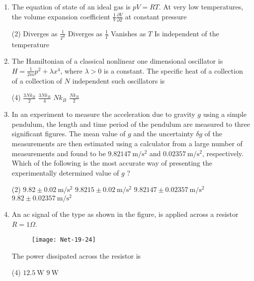 \begin{enumerate}
\begin{tasks}
\begin{figure}[H]
	\end{figure}
\end{tasks}
\item  The equation of state of an ideal gas is $p V=R T .$ At very low temperatures, the volume expansion coefficient $\frac{1}{V} \frac{\partial V}{\partial T}$ at constant pressure
 \begin{tasks}(2)
	\task[\textbf{a.}]Diverges as $\frac{1}{T^{2}}$
	\task[\textbf{b.}]Diverges as $\frac{1}{T}$
	\task[\textbf{c.}]Vanishes as $T$
	\task[\textbf{d.}]Is independent of the temperature 
\end{tasks}
\item  The Hamiltonian of a classical nonlinear one dimensional oscillator is $H=\frac{1}{2 m} p^{2}+\lambda x^{4}$, where $\lambda>0$ is a constant. The specific heat of a collection of a collection of $N$ independent such oscillators is
 \begin{tasks}(4)
	\task[\textbf{a.}]$\frac{3 N k_{B}}{2}$
	\task[\textbf{b.}]$\frac{3 N k_{B}}{4}$
	\task[\textbf{c.}]$N k_{B}$
	\task[\textbf{d.}]$\frac{N k_{B}}{2}$ 
\end{tasks}
\item  In an experiment to measure the acceleration due to gravity $g$ using a simple pendulum, the length and time period of the pendulum are measured to three significant figures. The mean value of $g$ and the uncertainty $\delta g$ of the measurements are then estimated using a calculator from a large number of measurements and found to be $9.82147 \mathrm{~m} / \mathrm{s}^{2}$ and $0.02357 \mathrm{~m} / \mathrm{s}^{2}$, respectively. Which of the following is the most accurate way of presenting the experimentally determined value of $g$ ?
 \begin{tasks}(2)
	\task[\textbf{a.}]$9.82 \pm 0.02 \mathrm{~m} / \mathrm{s}^{2}$
	\task[\textbf{b.}]$9.8215 \pm 0.02 \mathrm{~m} / \mathrm{s}^{2}$
	\task[\textbf{c.}]$9.82147 \pm 0.02357 \mathrm{~m} / \mathrm{s}^{2}$
	\task[\textbf{d.}] $9.82 \pm 0.02357 \mathrm{~m} / \mathrm{s}^{2}$ 
\end{tasks}
\item  An ac signal of the type as shown in the figure, is applied across a resistor $R=1 \Omega$.
\begin{figure}[H]
	\centering
	\texttt{[image: Net-19-24]}
\end{figure}
The power dissipated across the resistor is
 \begin{tasks}(4)
	\task[\textbf{a.}]$12.5 \mathrm{~W}$
	\task[\textbf{b.}]$9 \mathrm{~W}$

\end{tasks}
\end{enumerate}
